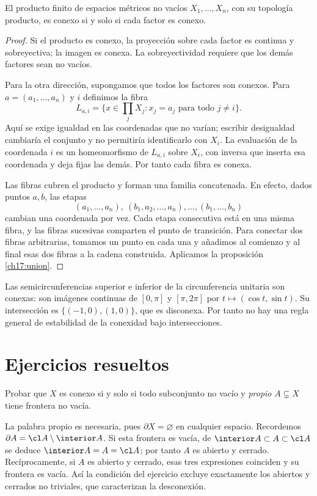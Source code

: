 \begin{teorema}\label{ch17:producto}
El producto finito de espacios métricos no vacíos $X_1,\ldots,X_n$, con su topología producto, es conexo si y solo si cada factor es conexo.
\end{teorema}
\begin{proof}
Si el producto es conexo, la proyección sobre cada factor es continua y sobreyectiva; la imagen es conexa. La sobreyectividad requiere que los demás factores sean no vacíos.

Para la otra dirección, supongamos que todos los factores son conexos. Para $a=(a_1,\ldots,a_n)$ y $i$ definimos la fibra
\[
L_{a,i}=\{x\in\textstyle\prod_jX_j:x_j=a_j\text{ para todo }j\ne i\}.
\]
Aquí se exige igualdad en las coordenadas que no varían; escribir desigualdad cambiaría el conjunto y no permitiría identificarlo con $X_i$. La evaluación de la coordenada $i$ es un homeomorfismo de $L_{a,i}$ sobre $X_i$, con inversa que inserta esa coordenada y deja fijas las demás. Por tanto cada fibra es conexa.

Las fibras cubren el producto y forman una familia concatenada. En efecto, dados puntos $a,b$, las etapas
\[
(a_1,\ldots,a_n),\ (b_1,a_2,\ldots,a_n),\ldots,(b_1,\ldots,b_n)
\]
cambian una coordenada por vez. Cada etapa consecutiva está en una misma fibra, y las fibras sucesivas comparten el punto de transición. Para conectar dos fibras arbitrarias, tomamos un punto en cada una y añadimos al comienzo y al final esas dos fibras a la cadena construida. Aplicamos la proposición \ref{ch17:union}.
\end{proof}

\begin{ejemplo}
Las semicircunferencias superior e inferior de la circunferencia unitaria son conexas: son imágenes continuas de $[0,\pi]$ y $[\pi,2\pi]$ por $t\mapsto(\cos t,\sin t)$. Su intersección es $\{(-1,0),(1,0)\}$, que es disconexa. Por tanto no hay una regla general de estabilidad de la conexidad bajo intersecciones.
\end{ejemplo}

\section{Ejercicios resueltos}
\begin{ejercicio}
Probar que $X$ es conexo si y solo si todo subconjunto no vacío y \emph{propio} $A\subsetneq X$ tiene frontera no vacía.
\end{ejercicio}
\begin{solucion}
La palabra propio es necesaria, pues $\partial X=\varnothing$ en cualquier espacio. Recordemos $\partial A=\cl A\setminus\interior A$. Si esta frontera es vacía, de $\interior A\subset A\subset\cl A$ se deduce $\interior A=A=\cl A$; por tanto $A$ es abierto y cerrado. Recíprocamente, si $A$ es abierto y cerrado, esas tres expresiones coinciden y su frontera es vacía. Así la condición del ejercicio excluye exactamente los abiertos y cerrados no triviales, que caracterizan la desconexión.
\end{solucion}

